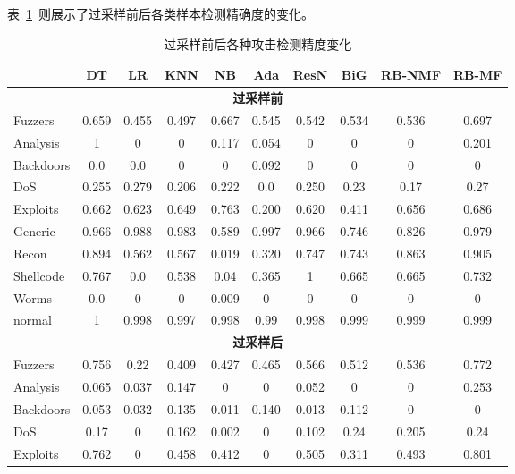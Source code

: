 表~\ref{tab:oversampling_performance}~则展示了过采样前后各类样本检测精确度的变化。
\begin{table}[htbp]
	\centering
	\caption{过采样前后各种攻击检测精度变化}
	\label{tab:oversampling_performance}
	\begin{tabular}{lccccccccc}
		\toprule
		          & DT    & LR    & KNN   & NB    & Ada   & ResN  & BiG   & RB-NMF & RB-MF \\
		\midrule
		\multicolumn{10}{c}{\textbf{过采样前}}                                                 \\
		Fuzzers   & 0.659 & 0.455 & 0.497 & 0.667 & 0.545 & 0.542 & 0.534 & 0.536  & 0.697 \\
		Analysis  & 1     & 0     & 0     & 0.117 & 0.054 & 0     & 0     & 0      & 0.201 \\
		Backdoors & 0.0   & 0.0   & 0     & 0     & 0.092 & 0     & 0     & 0      & 0     \\
		DoS       & 0.255 & 0.279 & 0.206 & 0.222 & 0.0   & 0.250 & 0.23  & 0.17   & 0.27  \\
		Exploits  & 0.662 & 0.623 & 0.649 & 0.763 & 0.200 & 0.620 & 0.411 & 0.656  & 0.686 \\
		Generic   & 0.966 & 0.988 & 0.983 & 0.589 & 0.997 & 0.966 & 0.746 & 0.826  & 0.979 \\
		Recon     & 0.894 & 0.562 & 0.567 & 0.019 & 0.320 & 0.747 & 0.743 & 0.863  & 0.905 \\
		Shellcode & 0.767 & 0.0   & 0.538 & 0.04  & 0.365 & 1     & 0.665 & 0.665  & 0.732 \\
		Worms     & 0.0   & 0     & 0     & 0.009 & 0     & 0     & 0     & 0      & 0     \\
		normal    & 1     & 0.998 & 0.997 & 0.998 & 0.99  & 0.998 & 0.999 & 0.999  & 0.999 \\
		\midrule
		\multicolumn{10}{c}{\textbf{过采样后}}                                                 \\
		Fuzzers   & 0.756 & 0.22  & 0.409 & 0.427 & 0.465 & 0.566 & 0.512 & 0.536  & 0.772 \\
		Analysis  & 0.065 & 0.037 & 0.147 & 0     & 0     & 0.052 & 0     & 0      & 0.253 \\
		Backdoors & 0.053 & 0.032 & 0.135 & 0.011 & 0.140 & 0.013 & 0.112 & 0      & 0     \\
		DoS       & 0.17  & 0     & 0.162 & 0.002 & 0     & 0.102 & 0.24  & 0.205  & 0.24  \\
		Exploits  & 0.762 & 0     & 0.458 & 0.412 & 0     & 0.505 & 0.311 & 0.493  & 0.801 \\

\end{tabular}
\end{table}
